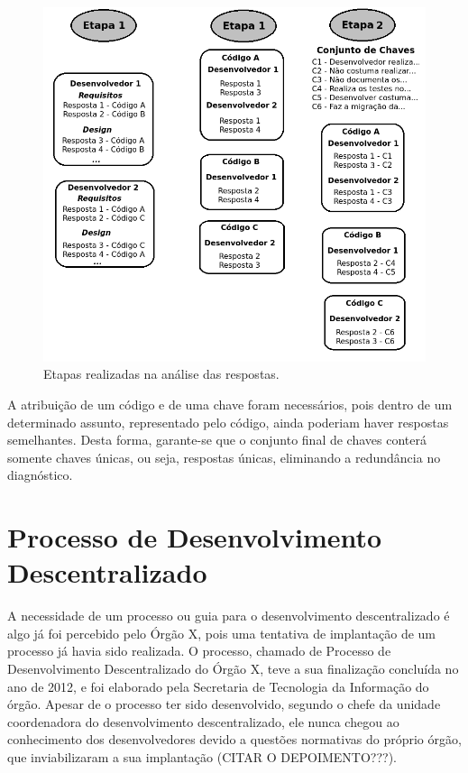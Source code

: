 \begin{figure}[h]
	\centering
	\label{fig02}
		\includegraphics[scale=0.7]{figuras/Esquematico_Analise_2}
	\caption{Etapas realizadas na análise das respostas.}
\end{figure}

A atribuição de um código e de uma chave foram necessários, pois dentro de um determinado assunto, representado pelo código, ainda poderiam haver respostas semelhantes. Desta forma, garante-se que o conjunto final de chaves conterá somente chaves únicas, ou seja, respostas únicas, eliminando a redundância no diagnóstico.
\clearpage

\section{Processo de Desenvolvimento Descentralizado}

A necessidade de um processo ou guia para o desenvolvimento descentralizado é algo já foi percebido pelo Órgão X, pois uma tentativa de implantação de um processo já havia sido realizada. O processo, chamado de Processo de Desenvolvimento Descentralizado do Órgão X, teve a sua finalização concluída no ano de 2012, e foi elaborado pela Secretaria de Tecnologia da Informação do órgão. Apesar de o processo ter sido desenvolvido, segundo o chefe da unidade coordenadora do desenvolvimento descentralizado, ele nunca chegou ao conhecimento dos desenvolvedores devido a questões normativas do próprio órgão, que inviabilizaram a sua implantação (CITAR O DEPOIMENTO???).

